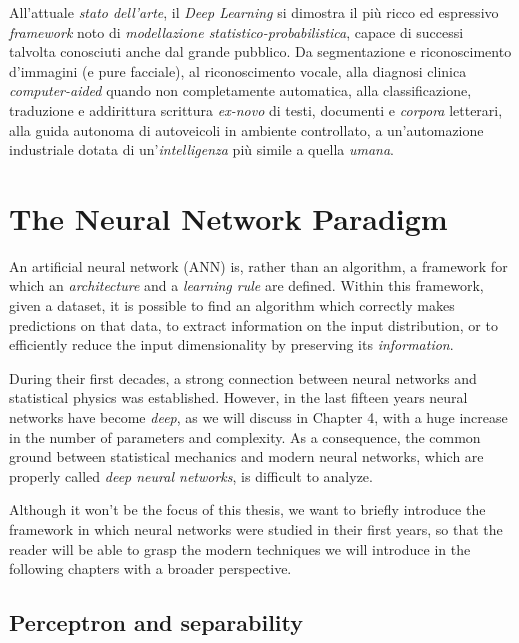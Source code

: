 \documentclass[a4paper, twoside]{article}
\begin{document}
All'attuale \textit{stato dell'arte}, il \textit{Deep Learning} si dimostra il più ricco ed espressivo \textit{framework} noto di \textit{modellazione statistico-probabilistica}, capace di successi talvolta conosciuti anche dal grande pubblico. Da segmentazione e riconoscimento d'immagini (e pure facciale), al riconoscimento vocale, alla diagnosi clinica \textit{computer-aided} quando non completamente automatica, alla classificazione, traduzione e addirittura scrittura \textit{ex-novo} di testi, documenti e \textit{corpora} letterari, alla guida autonoma di autoveicoli in ambiente controllato, a un'automazione industriale dotata di un'\textit{intelligenza} più simile a quella \textit{umana}.




\newpage
\section{The Neural Network Paradigm}

An artificial neural network (ANN) is, rather than an algorithm, a framework for which an \textit{architecture} and a \textit{learning rule} are defined. Within this framework, given a dataset, it is possible to find an algorithm which correctly makes predictions on that data, to extract information on the input distribution, or to efficiently reduce the input dimensionality by preserving its \textit{information}.

During their first decades, a strong connection between neural networks and statistical physics was established. However, in the last fifteen years neural networks have become \textit{deep}, as we will discuss in Chapter 4, with a huge increase in the number of parameters and complexity. As a consequence, the common ground between statistical mechanics and modern neural networks, which are properly called \textit{deep neural networks}, is difficult to analyze.

Although it won't be the focus of this thesis, we want to briefly introduce the framework in which neural networks were studied in their first years, so that the reader will be able to grasp the modern techniques we will introduce in the following chapters with a broader perspective.

    \subsection{Perceptron and separability}
\end{document}
